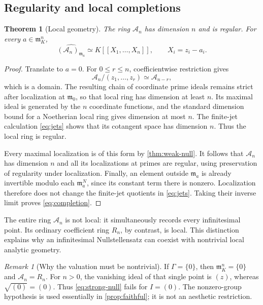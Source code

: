 \documentclass[11pt,letterpaper]{article}
\newtheorem{theorem}{Theorem}[section]
\theoremstyle{definition}
\theoremstyle{remark}
\newtheorem{remark}[remark]{Remark}
\newcommand{\A}{\mathscr A}
\newcommand{\m}{\mathfrak m}
\numberwithin{equation}{section}
\begin{document}
\subsection{Regularity and local completions}
\begin{theorem}[Local geometry]\label{thm:regular}
The ring $\A_n$ has dimension $n$ and is regular. For every $a\in\m_K^n$,
\begin{equation}\label{eq:completion}
 \widehat{(\A_n)_{\m_a}}\simeq K[[X_1,\ldots,X_n]],
 \qquad X_i=z_i-a_i.
\end{equation}
\end{theorem}
\begin{proof}
Translate to $a=0$. For $0\le r\le n$, coefficientwise restriction gives
\[
 \A_n/(z_1,\ldots,z_r)\simeq\A_{n-r},
\]
which is a domain. The resulting chain of coordinate prime ideals remains strict after localization at $\m_0$, so that local ring has dimension at least $n$. Its maximal ideal is generated by the $n$ coordinate functions, and the standard dimension bound for a Noetherian local ring gives dimension at most $n$. The finite-jet calculation \eqref{eq:jets} shows that its cotangent space has dimension $n$. Thus the local ring is regular.

Every maximal localization is of this form by \cref{thm:weak-null}. It follows that $\A_n$ has dimension $n$ and all its localizations at primes are regular, using preservation of regularity under localization. Finally, an element outside $\m_a$ is already invertible modulo each $\m_a^N$, since its constant term there is nonzero. Localization therefore does not change the finite-jet quotients in \eqref{eq:jets}. Taking their inverse limit proves \eqref{eq:completion}.
\end{proof}

The entire ring $\A_n$ is not local: it simultaneously records every infinitesimal point. Its ordinary coefficient ring $R_n$, by contrast, is local. This distinction explains why an infinitesimal Nullstellensatz can coexist with nontrivial local analytic geometry.

\begin{remark}[Why the valuation must be nontrivial]
If $\Gamma=\{0\}$, then $\m_K^n=\{0\}$ and $\A_n=R_n$. For $n>0$, the vanishing ideal of that single point is $(z)$, whereas $\sqrt{(0)}=(0)$. Thus \eqref{eq:strong-null} fails for $I=(0)$. The nonzero-group hypothesis is used essentially in \cref{prop:faithful}; it is not an aesthetic restriction.
\end{remark}
\end{document}
